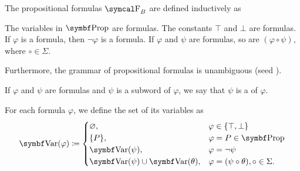 \begin{definition}\label{def:propositional_formula}
  The propositional formulas \( \CF_B \) are defined inductively as
  \begin{DefEnum}
     The variables in \( \Bold{Prop} \) are formulas.
     The constants \( \top \) and \( \bot \) are formulas.
     If \( \varphi \) is a formula, then \( \neg \varphi \) is a formula.
     If \( \varphi \) and \( \psi \) are formulas, so are \( (\varphi \circ \psi) \), where \( \circ \in \Sigma \).
  \end{DefEnum}

  Furthermore, the grammar of propositional formulas is unambiguous (seed ).

  If \( \varphi \) and \( \psi \) are formulas and \( \psi \) is a subword of \( \varphi \), we say that \( \psi \) is a  of \( \varphi \).

  For each formula \( \varphi \), we define the set of its variables as
  \begin{equation}\label{def:propositional_formula/var}
    \Bold{Var}(\varphi) \coloneqq \begin{cases}
      \varnothing,                              & \varphi \in \{ \top, \bot \}                     \\
      \{ P \},                                  & \varphi = P \in \Bold{Prop}                      \\
      \Bold{Var}(\psi),                         & \varphi = \neg \psi                              \\
      \Bold{Var}(\psi) \cup \Bold{Var}(\theta), & \varphi = (\psi \circ \theta), \circ \in \Sigma.
    \end{cases}
  \end{equation}
\end{definition}


